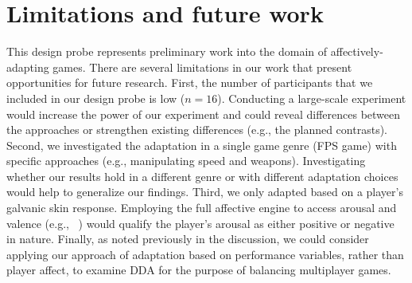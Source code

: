 \section{Limitations and future work}
This design probe represents preliminary work into the domain of affectively-adapting games. There are several limitations in our work that present opportunities for future research. First, the number of participants that we included in our design probe is low ($n=16$). Conducting a large-scale experiment would increase the power of our experiment and could reveal differences between the approaches or strengthen existing differences (e.g., the planned contrasts). Second, we investigated the adaptation in a single game genre (FPS game) with specific approaches (e.g., manipulating speed and weapons). Investigating whether our results hold in a different genre or with different adaptation choices would help to generalize our findings. Third, we only adapted based on a player's galvanic skin response. Employing the full affective engine to access arousal and valence (e.g., ~\cite{mandryk2007fuzzy}) would qualify the player's arousal as either positive or negative in nature. Finally, as noted previously in the discussion, we could consider applying our approach of adaptation based on performance variables, rather than player affect, to examine DDA for the purpose of balancing multiplayer games.
